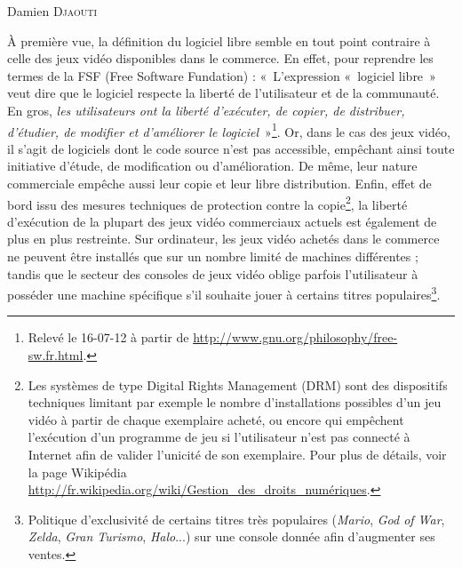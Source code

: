 \documentclass{FramateX}
\begin{document}
\begin{refsection}

\begin{flushright}
Damien \textsc{Djaouti}
\end{flushright}
\vspace{10 mm}

À première vue, la définition du logiciel libre semble en tout point
contraire à celle des jeux vidéo disponibles dans le commerce. En
effet, pour reprendre les termes de la
FSF (Free Software Fundation) :
«~L'expression «~logiciel libre~» veut dire que le logiciel respecte la
liberté de l'utilisateur et de la communauté. En gros,
\textit{les utilisateurs ont la liberté
d'exécuter, de copier, de distribuer, d'étudier, de modifier et
d'améliorer le logiciel}~»\footnote{Relevé le 16-07-12 à partir de
\url{http://www.gnu.org/philosophy/free-sw.fr.html}.}. Or, dans le cas
des jeux vidéo, il s'agit de logiciels dont le code source n'est pas
accessible, empêchant ainsi toute initiative d'étude, de modification
ou d'amélioration. De même, leur nature commerciale empêche aussi leur
copie et leur libre distribution. Enfin, effet de bord issu des mesures
techniques de protection contre la copie\footnote{Les systèmes de
type Digital Rights Management (DRM) sont des dispositifs techniques
limitant par exemple le nombre d'installations possibles d'un jeu vidéo
à partir de chaque exemplaire acheté, ou encore qui empêchent
l'exécution d'un programme de jeu si l'utilisateur n'est pas connecté à
Internet afin de valider l'unicité de son exemplaire. Pour plus de
détails, voir la page Wikipédia \url{http://fr.wikipedia.org/wiki/Gestion_des_droits_numériques}.},
la liberté d'exécution de la plupart des jeux vidéo commerciaux actuels
est également de plus en plus restreinte. Sur ordinateur, les jeux
vidéo achetés dans le commerce ne peuvent être installés que sur un
nombre limité de machines différentes ; tandis que le secteur des
consoles de jeux vidéo oblige parfois l'utilisateur à posséder une
machine spécifique s'il souhaite jouer à certains titres
populaires\footnote{Politique d'exclusivité
de certains titres très populaires (\textit{Mario}, \textit{God of
War}, \textit{Zelda}, \textit{Gran Turismo}, \textit{Halo}...) sur une
console donnée afin d'augmenter ses ventes.}.


\end{refsection}
\end{document}
